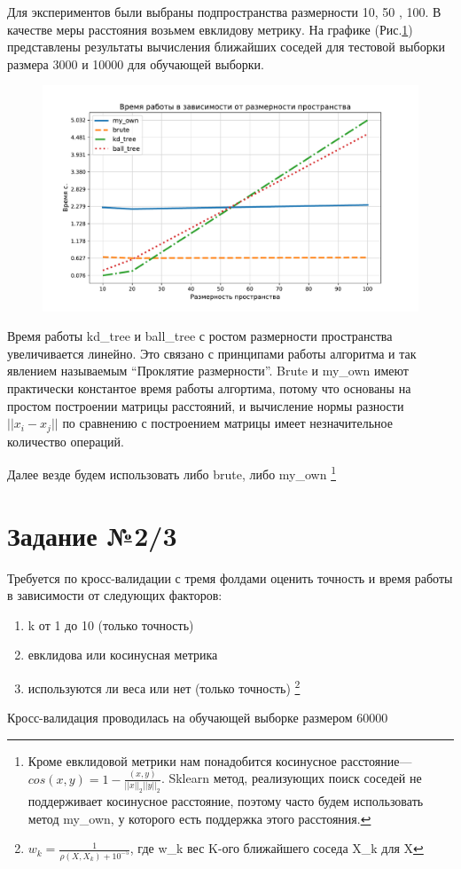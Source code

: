\documentclass[12pt,fleqn]{article}
\begin{document}
Для экспериментов были выбраны подпространства размерности 10, 50 , 100.
В качестве меры расстояния возьмем евклидову метрику.
\newpage
На графике (Рис.\ref{pic1}) представлены результаты вычисления ближайших соседей для тестовой выборки размера 3000 и 10000
для обучающей выборки. 
\begin{figure}
    \centering
    \includegraphics[width=15cm]{task1.pdf} 
    \caption{}
    \label{pic1}
\end{figure}

Время работы kd\_tree и ball\_tree с ростом размерности пространства увеличивается линейно.
Это связано с принципами работы алгоритма и так явлением называемым ``Проклятие размерности''.
Brute и my\_own имеют практически константое время работы алгортима, потому что основаны на простом построении матрицы 
расстояний, и вычисление нормы разности $||x_i-x_j||$  по сравнению с построением матрицы имеет
незначительное количество операций. 

Далее везде будем использовать либо brute, либо my\_own 
\footnote{Кроме евклидовой метрики нам понадобится косинусное расстояние---
$cos(x, y)=1- \frac{(x, y)}{||x||_2||y||_2}$.
Sklearn метод, реализующих поиск соседей не поддерживает косинусное расстояние,
поэтому часто будем использовать метод my\_own, у которого есть поддержка этого расстояния.}

\section{Задание №2/3}
Требуется по кросс-валидации с тремя фолдами оценить точность и время работы в зависимости от следующих
факторов:
\begin{enumerate}
    \item k от 1 до 10 (только точность)
    \item евклидова или косинусная метрика
    \item используются ли веса или нет (только точность)
    \footnote{$w_k=\frac{1}{\rho(X,X_k)+10^{-5}}$, где w\_k вес K-ого ближайшего соседа X\_k для X}
\end{enumerate}
Кросс-валидация проводилась на обучающей выборке размером 60000
\newpage
\end{document}
